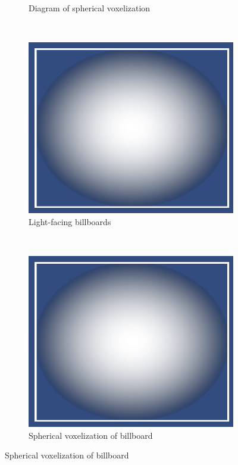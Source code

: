 \begin{figure}[t]
\begin{subfigure}[t]{0.4\textwidth}
	\caption{Diagram of spherical voxelization}
	\end{subfigure}
	~
	\begin{subfigure}[t]{0.4\textwidth}
	\includegraphics[width=\textwidth]{../res/spherebillboard.png}
	\caption{Light-facing billboards}
	\end{subfigure}
	~
	\begin{subfigure}[t]{0.4\textwidth}
	\includegraphics[width=\textwidth]{../res/spherebillboard.png}
	\caption{Spherical voxelization of billboard}
	\end{subfigure}

\end{figure}

